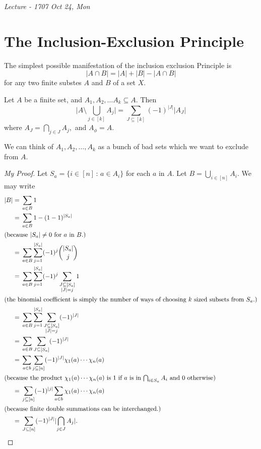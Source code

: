
\noindent
\emph{Lecture - 17\hfill 07 Oct 24, Mon}

\section{The Inclusion-Exclusion Principle}
The simplest possible manifestation of the inclusion exclusion Principle
is
$$ \lvert A \cap B \rvert = \lvert A \rvert + \lvert B \rvert - \lvert A \cap B \rvert$$
for any two finite substes $A$ and $B$ of a set $X.$

\begin{theorem}
	Let $A$ be a finite set, and $A_1, A_2, \dotsc A_k \subseteq A.$
	Then
	$$ \lvert A \setminus \bigcup_{j \in [k]} A_j \rvert
	= \sum_{J \subseteq[k]} (-1)^{ \lvert  J \rvert} \lvert A_J \rvert$$
	where $A_J = \bigcap_{j \in J} A_j,$ and $A_{\phi} = A.$
\end{theorem}

\begin{remark}
	We can think of $A_1, A_2, \dotsc, A_k$ as a bunch of bad sets
	which we want to exclude from $A.$
\end{remark}

\begin{proof}[My Proof]
	Let $S_a = \{ i \in [n] \, : \, a \in A_i \}$ for each $a$ in 
	$A.$ Let $B = \bigcup_{i \in [n]} A_i.$ We may write
\begin{align*}
	\lvert B \rvert%
	={}& \sum_{a \in B} 1 \\
	={}& \sum_{a \in B} 1 - (1-1)^{ \lvert S_a \rvert} \\
	\intertext{(because $ \lvert S_a \rvert \not = 0$ for $a$
	in $B.$)}
	={}& \sum_{a \in B} \sum_{j=1}^{ \lvert S_a \rvert} (-1)^j
	\binom{ \lvert S_a \rvert}{j} \\
	={}& \sum_{a \in B} \sum_{j=1}^{ \lvert S_a \rvert} (-1)^j
\sum_{\substack{ J \subseteq [S_a]\\ \lvert J \rvert = j}} 1 \\
	\intertext{(the binomial coefficient is simply the number of ways of choosing $k$ sized subsets from $S_a.$)}
	={}& \sum_{a \in B} \sum_{j=1}^{ \lvert S_a \rvert}
\sum_{\substack{ J \subseteq [S_a]\\ \lvert J \rvert = j}} (-1)^{ \lvert J \rvert} \\
	={}& \sum_{a \in B} \sum_{J \subseteq [S_a]} (-1)^{ \lvert J \rvert} \\ 
	={}& \sum_{a \in b} \sum_{j \subseteq [n]} (-1)^{ \lvert J \rvert} \chi_1(a) \cdots \chi_n(a) \\
	\intertext{(because the product $\chi_1(a) \cdots \chi_n(a)$
		is $1$ if $a$ is in $\bigcap_{i \in S_a} A_i$ and
	$0$ otherwise)}
	={}& \sum_{j \subseteq [n]} (-1)^{ \lvert j \rvert}
	\sum_{a \in b} \chi_1(a) \cdots \chi_n(a) \\
	\intertext{(because finite double summations can be interchanged.)}
	={}& \sum_{J \subseteq [n]} (-1)^{ \lvert J \rvert}
	\lvert \bigcap_{j \in J} A_j \rvert .
\end{align*}
\end{proof}

